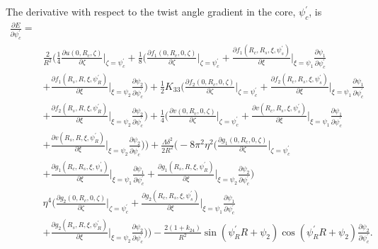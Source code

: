 \documentclass[12pt]{article}
\begin{document}
The derivative with respect to the twist angle gradient in the core, $\psi_c^{\prime}$, is
\begin{align}
\frac{\partial E}{\partial \psi_c^{\prime}}=&\nonumber\\
&\frac{2}{R^2}\bigg(\frac{1}{4}\frac{\partial u(0,R_c,\zeta)}{\partial\zeta}\bigg|_{\zeta=\psi_c^{\prime}}+\frac{1}{8}\bigg(\frac{\partial f_1(0,R_c,0,\zeta)}{\partial\zeta}\bigg|_{\zeta=\psi_c^{\prime}}+\frac{\partial f_1(R_c,R_s,\xi,\psi_s^{\prime})}{\partial \xi}\bigg|_{\xi=\psi_1}\frac{\partial\psi_1}{\partial\psi_c^{\prime}}\nonumber\\
&+\frac{\partial f_1(R_s,R,\xi,\psi_R^{\prime})}{\partial\xi}\bigg|_{\xi=\psi_2}\frac{\partial\psi_2}{\partial\psi_c^{\prime}}\bigg)+\frac{1}{2}K_{33}\bigg(\frac{\partial f_2(0,R_c,0,\zeta)}{\partial\zeta}\bigg|_{\zeta=\psi_c^{\prime}}+\frac{\partial f_2(R_c,R_s,\xi,\psi_s^{\prime})}{\partial\xi}\bigg|_{\xi=\psi_1}\frac{\partial\psi_1}{\partial\psi_c^{\prime}}\nonumber\\
&+\frac{\partial f_2(R_s,R,\xi,\psi_R^{\prime})}{\partial\xi}\bigg|_{\xi=\psi_2}\frac{\partial\psi_2}{\partial\psi_c^{\prime}}\bigg)+\frac{1}{4}\bigg(\frac{\partial v(0,R_c,0,\zeta)}{\partial\zeta}\bigg|_{\zeta=\psi_c^{\prime}}+\frac{\partial v(R_c,R_s,\xi,\psi_s^{\prime})}{\partial\xi}\bigg|_{\xi=\psi_1}\frac{\partial\psi_1}{\partial\psi_c^{\prime}}\nonumber\\
&+\frac{\partial v(R_s,R,\xi,\psi_R^{\prime})}{\partial\xi}\bigg|_{\xi=\psi_2}\frac{\partial\psi_2}{\partial\psi_c^{\prime}}\bigg)\bigg)+\frac{\Lambda\delta^2}{2R^2}\bigg(-8\pi^2\eta^2\bigg(\frac{\partial g_1(0,R_c,0,\zeta)}{\partial\zeta}\bigg|_{\zeta=\psi_c^{\prime}}\nonumber\\
&+\frac{\partial g_1(R_c,R_s,\xi,\psi_s^{\prime})}{\partial\xi}\bigg|_{\xi=\psi_1}\frac{\partial\psi_1}{\partial\psi_c^{\prime}}+\frac{\partial g_1(R_s,R,\xi,\psi_R^{\prime})}{\partial\xi}\bigg|_{\xi=\psi_2}\frac{\partial \psi_2}{\partial\psi_c^{\prime}}\bigg)\nonumber\\
&\eta^4\bigg(\frac{\partial g_2(0,R_c,0,\zeta)}{\partial\zeta}\bigg|_{\zeta=\psi_c^{\prime}}+\frac{\partial g_2(R_c,R_s,\xi,\psi_s^{\prime})}{\partial\xi}\bigg|_{\xi=\psi_1}\frac{\partial\psi_1}{\partial\psi_c^{\prime}}\nonumber\\
&+\frac{\partial g_2(R_s,R,\xi,\psi_R^{\prime})}{\partial\xi}\bigg|_{\xi=\psi_2}\frac{\partial\psi_2}{\partial\psi_c^{\prime}}\bigg)\bigg)-\frac{2(1+k_{24})}{R^2}\sin(\psi_R^{\prime}R+\psi_2)\cos(\psi_R^{\prime}R+\psi_2)\frac{\partial\psi_2}{\partial\psi_c^{\prime}}.\label{eq:dEdpsi_cp}
\end{align}
\end{document}
